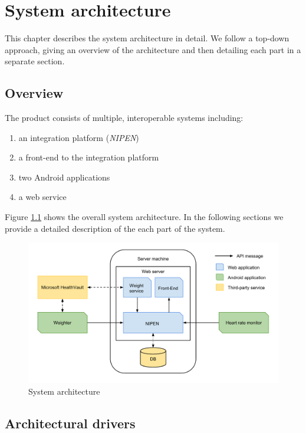 \chapter{System architecture}
\label{ch:architecture}


This chapter describes the system architecture in detail.
We follow a top-down approach, giving an overview of the architecture and then detailing each part in a separate section.

\section{Overview}

The product consists of multiple, interoperable systems including:
\begin{enumerate}[1.]
	\item an integration platform (\textit{NIPEN})
	\item a front-end to the integration platform
	\item two Android applications
	\item a web service
\end{enumerate}

Figure \ref{figure:architecture} shows the overall system architecture.
In the following sections we provide a detailed description of the each part of the system.

\begin{figure}[h]
\centering
\includegraphics[scale=0.5]{../Figures/architecture.pdf}
\caption{System architecture}
\label{figure:architecture}
\end{figure}

\newpage
\section{Architectural drivers}

